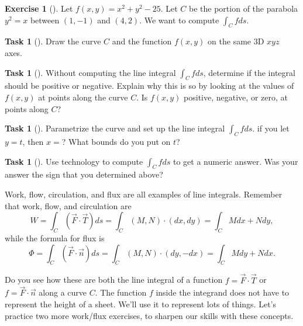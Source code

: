 \documentclass[10pt,]{book}
\theoremstyle{plain}
\theoremstyle{definition}
\theoremstyle{definition}
\theoremstyle{definition}
\theoremstyle{definition}
\newtheorem{exploration}[project]{Exercise}
\newtheorem{task}[project]{Task}
\theoremstyle{definition}
\numberwithin{equation}{section}
\begin{document}
\begin{exploration}[]\label{exploration-201}
\larsonfive{ } Let \(f(x,y)=x^2+y^2-25\). Let \(C\) be the portion of the parabola \(y^2=x\) between \((1,-1)\) and \((4,2)\). We want to compute \(\int_C fds\).%
\begin{task}[]\label{task-504}
Draw the curve \(C\) and the function \(f(x,y)\) on the same 3D \(xyz\) axes.%
\end{task}
\begin{task}[]\label{task-505}
Without computing the line integral \(\int_C fds\), determine if the integral should be positive or negative. Explain why this is so by looking at the values of \(f(x,y)\) at points along the curve \(C\).  Is \(f(x,y)\) positive, negative, or zero, at points along \(C\)?%
\end{task}
\begin{task}[]\label{task-506}
Parametrize the curve and set up the line integral \(\int_C f ds\). if you let \(y=t\), then \(x=\)? What bounds do you put on \(t\)?%
%
\end{task}
\begin{task}[]\label{task-507}
Use technology to compute \(\int_C fds\) to get a numeric answer.  Was your answer the sign that you determined above?%
\end{task}
\end{exploration}
Work, flow, circulation, and flux are all examples of line integrals. Remember that work, flow, and circulation are%
\begin{equation*}
W=\int_C (\vec F\cdot \vec T)ds =\int_C (M,N)\cdot(dx,dy) =  \int_C Mdx+Ndy,
\end{equation*}
while the formula for flux is%
\begin{equation*}
\Phi=\int_C (\vec F\cdot \vec n)ds =\int_C (M,N)\cdot(dy,-dx) =  \int_C Mdy+Ndx.
\end{equation*}
%
\par
Do you see how these are both the line integral of a function \(f = \vec F\cdot \vec T\) or \(f=\vec F\cdot \vec n\) along a curve \(C\). The function \(f\) inside the integrand does not have to represent the height of a sheet. We'll use it to represent lots of things. Let's practice two more work/flux exercises, to sharpen our skills with these concepts.%
\end{document}
